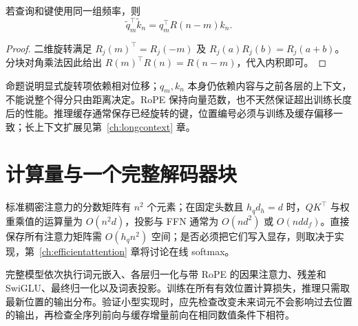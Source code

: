 \begin{proposition}
\label{prop:rope-relative}
若查询和键使用同一组频率，则
\[
\widetilde q_m^\top\widetilde k_n=q_m^\top R(n-m)k_n.
\]
\end{proposition}
\begin{proof}
二维旋转满足 $R_j(m)^\top=R_j(-m)$ 及 $R_j(a)R_j(b)=R_j(a+b)$。分块对角乘法因此给出 $R(m)^\top R(n)=R(n-m)$，代入内积即可。
\end{proof}

命题说明显式旋转项依赖相对位移；$q_m,k_n$ 本身仍依赖内容与之前各层的上下文，不能说整个得分只由距离决定。RoPE 保持向量范数，也不天然保证超出训练长度后的性能。推理缓存通常保存已经旋转的键，位置编号必须与训练及缓存偏移一致；长上下文扩展见第~\ref{ch:longcontext} 章。

\section{计算量与一个完整解码器块}

标准稠密注意力的分数矩阵有 $n^2$ 个元素；在固定头数且 $h_qd_h=d$ 时，$QK^\top$ 与权重乘值的运算量为 $O(n^2d)$，投影与 FFN 通常为 $O(nd^2)$ 或 $O(ndd_f)$。直接保存所有注意力矩阵需 $O(h_qn^2)$ 空间；是否必须把它们写入显存，则取决于实现，第~\ref{ch:efficientattention} 章将讨论在线 softmax。

完整模型依次执行词元嵌入、各层归一化与带 RoPE 的因果注意力、残差和 SwiGLU、最终归一化以及词表投影。训练在所有有效位置计算损失，推理只需取最新位置的输出分布。验证小型实现时，应先检查改变未来词元不会影响过去位置的输出，再检查全序列前向与缓存增量前向在相同数值条件下相符。

